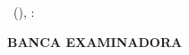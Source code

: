 
% 

\begin{folhadeaprovacao}

  \begin{center}
    {\ABNTEXchapterfont\normalsize\imprimirautor}

    \vspace*{7.5cm}

    \begin{center}
      \ABNTEXchapterfont\bfseries\normalsize\imprimirtitulo
    \end{center}
    
    \vspace*{1cm}
    
    \hspace{.45\textwidth}
    \begin{minipage}{.5\textwidth}
        \imprimirpreambulo
    \end{minipage}%
    \vspace*{\fill}
   \end{center}
    
    \vspace*{0.25cm}
    
    \begin{center}
      \imprimirlocal ~(\estado), \Data :
    \end{center}    

    \vspace*{-0.5cm}

   \assinatura{\textbf{\imprimirorientador} \\ \nomeinstituicao}
   \vspace*{\fill}
   \begin{center}
       \textbf{BANCA EXAMINADORA}
   \end{center}
   \vspace*{-1.5cm}
   \assinatura{\textbf{\primeiroavaliador}\\ \primeiroavaliadorafiliacao}
   \assinatura{\textbf{\segundoavaliador}\\ \segundoavaliadorafiliacao}
 
\end{folhadeaprovacao}